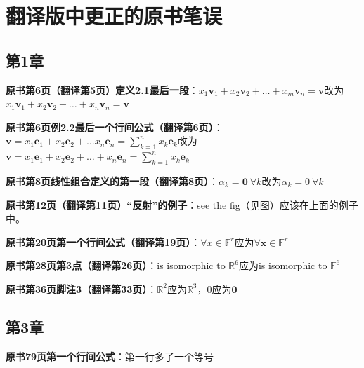 \chapter*{翻译版中更正的原书笔误}

\section*{第1章}

{\bf 原书第6页（翻译第5页）定义2.1最后一段}：$x_{1}\mathbf{v}_{1}+x_{2}\mathbf{v}_{2}+\ldots+x_{m}\mathbf{v}_{n}=\mathbf{v}$改为$x_{1}\mathbf{v}_{1}+x_{2}\mathbf{v}_{2}+\ldots+x_{n}\mathbf{v}_{n}=\mathbf{v}$

{\bf 原书第6页例2.2最后一个行间公式（翻译第6页）}：$\mathbf{v}=x_1\mathbf{e}_1+x_2\mathbf{e}_2+\ldots x_n\mathbf{e}_n=\sum_{k=1}^nx_k\mathbf{e}_k$改为$\mathbf{v}=x_1\mathbf{e}_1+x_2\mathbf{e}_2+\ldots +x_n\mathbf{e}_n=\sum_{k=1}^nx_k\mathbf{e}_k$

{\bf 原书第8页线性组合定义的第一段（翻译第8页）}：$\alpha_{k}=\mathbf{0}\ \forall k$改为$\alpha_{k}=0\ \forall k$

{\bf 原书第12页（翻译第11页）“反射”的例子}：see the fig（见图）应该在上面的例子中。

{\bf 原书第20页第一个行间公式（翻译第19页）}：$\forall {x}\in\mathbb{F}^r$应为$\forall \mathbf{x}\in\mathbb{F}^r$

{\bf 原书第28页第3点（翻译第26页）}：is isomorphic to $\mathbb{R}^6$应为is isomorphic to $\mathbb{F}^6$

{\bf 原书第36页脚注3（翻译第33页）}：$\mathbb{R}^2$应为$\mathbb{R}^3$，$0$应为$\mathbf{0}$

\section*{第3章}

{\bf 原书79页第一个行间公式}：第一行多了一个等号